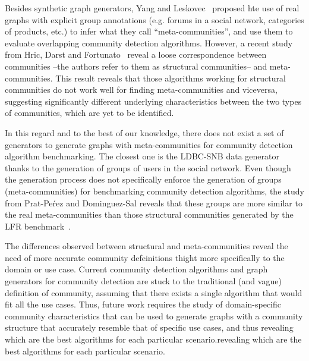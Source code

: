 Besides synthetic graph generators, Yang and Leskovec~\cite{yang2015defining} proposed hte use of real graphs with explicit group annotations (e.g. forums in a social network, categories of products, etc.) to infer what they call ``meta-communities'', and use them to evaluate overlapping community detection algorithms. However, a recent study from Hric, Darst and Fortunato~\cite{hric2014community} reveal a loose correspondence between  communities --the authors refer to them as structural communities-- and meta-communities.  This result reveals that those algorithms working for structural communities do not work well for finding meta-communities and viceversa, suggesting significantly different underlying characteristics between the two types of communities, which are yet to be identified.

In this regard and to the best of our knowledge, there does not exist a set of generators to generate graphs with meta-communities for community detection algorithm benchmarking. The closest one is the LDBC-SNB data generator~\cite{Erling:2015:LSN:2723372.2742786} thanks to the generation of groups of users in the social network. Even though the generation process does not specifically enforce the generation of groups (meta-communities) for benchmarking community detection algorithms, the study from Prat-Pe\'rez and Dominguez-Sal reveals that these groups are more similar to the real meta-communities than those structural communities generated by the LFR benchmark~\cite{Prat-Perez:2014:CSS:2621934.2621942}.

The differences observed between structural and meta-communities reveal the need of more accurate community defeinitions thight more specifically to the domain or use case. Current community detection algorithms and graph generators for community detection are stuck to the traditional (and vague) definition of community, assuming that there exists a single algorithm that would fit all the use cases. Thus, future work requires the study of domain-specific community characteristics that can be used to generate graphs with a community structure that accurately resemble that of specific use cases, and thus revealing which are the best algorithms for each particular scenario.revealing which are the best algorithms for each particular scenario.

